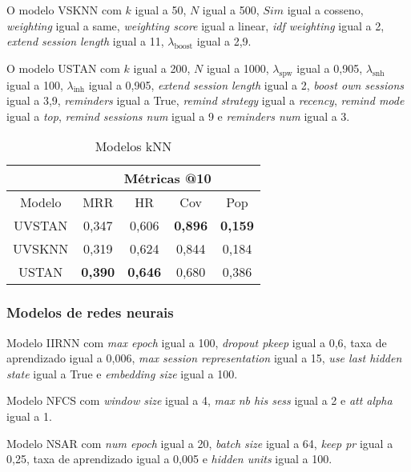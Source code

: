 O modelo VSKNN com $k$ igual a 50, $N$ igual a 500, $Sim$ igual a cosseno,
\textit{weighting} igual a same, \textit{weighting score} igual a linear,
\textit{idf weighting} igual a 2, \textit{extend session length} igual a 11,
$\lambda_{\text{boost}}$ igual a 2,9.

O modelo USTAN com $k$ igual a 200, $N$ igual a 1000, $\lambda_{\text{spw}}$
igual a 0,905, $\lambda_{\text{snh}}$ igual a 100, $\lambda_{\text{inh}}$ igual a
0,905, \textit{extend session length} igual a 2, \textit{boost own sessions}
igual a 3,9, \textit{reminders} igual a True, \textit{remind strategy} igual a
\textit{recency}, \textit{remind mode} igual a \textit{top}, \textit{remind
sessions num} igual a 9 e \textit{reminders num} igual a 3.

\begin{table}[htbp]
  \centering
  \begin{tabular}{|c|c|c|c|c|}
      \hline
      \multicolumn{1}{|c|}{} & \multicolumn{4}{c|}{Métricas @10} \\
      \hline
      Modelo & MRR & HR & Cov & Pop \\
      \hline
      UVSTAN & 0,347 & 0,606 & \textbf{0,896} & \textbf{0,159} \\
      \hline
      UVSKNN & 0,319 & 0,624 & 0,844 & 0,184 \\
      \hline
      USTAN & \textbf{0,390} & \textbf{0,646} & 0,680 & 0,386 \\
      \hline
      \end{tabular}
      \caption{Modelos kNN}
\end{table}



\subsubsection{Modelos de redes neurais}
Modelo IIRNN com \textit{max epoch} igual a 100, \textit{dropout pkeep} igual a
0,6, taxa de aprendizado igual a 0,006, \textit{max session representation} igual
a 15, \textit{use last hidden state} igual a True e \textit{embedding size} igual
a 100.

Modelo NFCS com \textit{window size} igual a 4, \textit{max nb his sess} igual a
2 e \textit{att alpha} igual a 1.

Modelo NSAR com \textit{num epoch} igual a 20, \textit{batch size} igual a 64,
\textit{keep pr} igual a 0,25, taxa de aprendizado igual a 0,005 e \textit{hidden
units} igual a 100.

